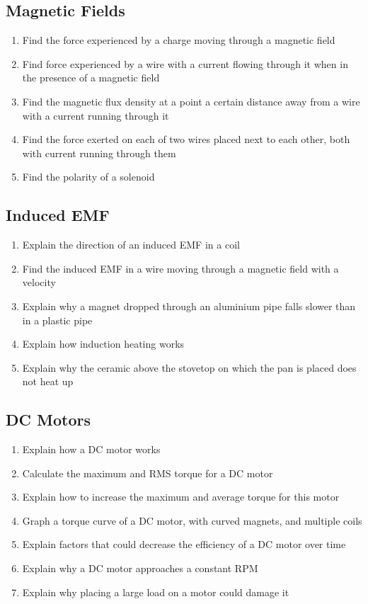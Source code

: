 \documentclass[a4paper,11pt]{report}
\begin{document}
\subsection{Magnetic Fields}

\begin{enumerate}
\item Find the force experienced by a charge moving through a magnetic field
\item Find force experienced by a wire with a current flowing through it when
	in the presence of a magnetic field
\item Find the magnetic flux density at a point a certain distance away from a
	wire with a current running through it
\item Find the force exerted on each of two wires placed next to each other,
	both with current running through them
\item Find the polarity of a solenoid
\end{enumerate}

\subsection{Induced EMF}

\begin{enumerate}
\item Explain the direction of an induced EMF in a coil
\item Find the induced EMF in a wire moving through a magnetic field with a
	velocity
\item Explain why a magnet dropped through an aluminium pipe falls slower than
	in a plastic pipe
\item Explain how induction heating works
\item Explain why the ceramic above the stovetop on which the pan is placed
	does not heat up
\end{enumerate}

\subsection{DC Motors}

\begin{enumerate}
\item Explain how a DC motor works
\item Calculate the maximum and RMS torque for a DC motor
\item Explain how to increase the maximum and average torque for this motor
\item Graph a torque curve of a DC motor, with curved magnets, and multiple
	coils
\item Explain factors that could decrease the efficiency of a DC motor over
	time
\item Explain why a DC motor approaches a constant RPM
\item Explain why placing a large load on a motor could damage it
\end{enumerate}
\end{document}
